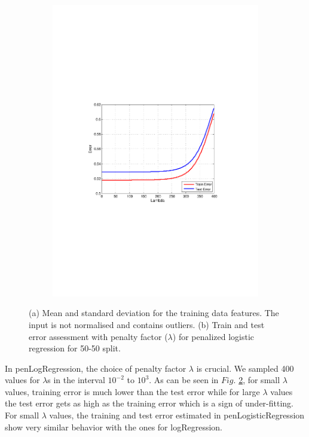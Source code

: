 \begin{figure}[h]
\begin{subfigure}[b]{0.45\textwidth}
   \includegraphics[clip, trim=4cm 9cm 3cm 10cm, width=\textwidth]{figures/Lambda_pLG.pdf}
    \label{fig:Lambda_pLr}
  \end{subfigure}
  \hfill
  \caption{(a) Mean and standard deviation for the training data features. The input is not normalised and contains outliers. (b) Train and test error assessment with penalty factor ($\lambda$) for penalized logistic regression for 50-50 split.}
\end{figure}

In penLogRegression, the choice of penalty factor $\lambda$ is crucial. We sampled 400 values for $\lambda$s in the interval  $10^{-2}$ to $10^3$. As can be seen in $Fig.$ \ref{fig:Lambda_pLr}, for small $\lambda$ values, training error is much lower than the test error while for large $\lambda$ values the test error gets as high as the training error which is a sign of under-fitting. 
For small $\lambda$ values, the training and test error estimated in penLogisticRegression show very similar behavior with the ones for logRegression. 

